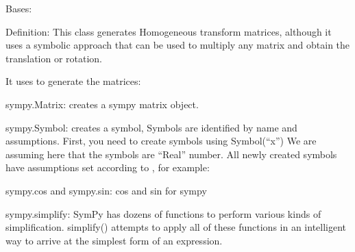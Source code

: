 \documentclass[letterpaper,10pt,english,openany,oneside]{sphinxmanual}
\begin{document}
\begin{fulllineitems}
\label{\detokenize{MatrixManipulationSymbolic:MatrixManipulationSymbolic.MatrixSymbolic}}
Bases: 

Definition: This class generates Homogeneous transform matrices, although it uses a symbolic approach
that can be used to multiply any matrix and obtain the translation or rotation.

It uses  to generate the matrices:

sympy.Matrix: creates a sympy matrix object.

sympy.Symbol: creates a symbol, Symbols are identified by name and assumptions.
First, you need to create symbols using Symbol(“x”)
We are assuming here that the symbols are “Real” number.
All newly created symbols have assumptions set according to , for example:

%
\begin{sphinxVerbatim}[commandchars=\\\{\}]
   
     
    
\end{sphinxVerbatim}

sympy.cos and sympy.sin: cos and sin for sympy

sympy.simplify: SymPy has dozens of functions to perform various kinds of simplification.
simplify() attempts to apply all of these functions
in an intelligent way to arrive at the simplest form of an expression.


\end{fulllineitems}
\end{document}
